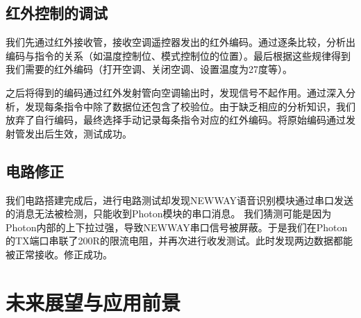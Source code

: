     \subsection{红外控制的调试}
    \hspace{1.5em}我们先通过红外接收管，接收空调遥控器发出的红外编码。通过逐条比较，分析出编码与指令的关系（如温度控制位、模式控制位的位置）。最后根据这些规律得到我们需要的红外编码（打开空调、关闭空调、设置温度为27度等）。

    \hspace{1.5em}之后将得到的编码通过红外发射管向空调输出时，发现信号不起作用。通过深入分析，发现每条指令中除了数据位还包含了校验位。由于缺乏相应的分析知识，我们放弃了自行编码，最终选择手动记录每条指令对应的红外编码。将原始编码通过发射管发出后生效，测试成功。

    \subsection{电路修正}
    \hspace{1.5em}我们电路搭建完成后，进行电路测试却发现NEWWAY语音识别模块通过串口发送的消息无法被检测，只能收到Photon模块的串口消息。
    \hspace{1.5em}我们猜测可能是因为Photon内部的上下拉过强，导致NEWWAY串口信号被屏蔽。于是我们在Photon的TX端口串联了200R的限流电阻，并再次进行收发测试。此时发现两边数据都能被正常接收。修正成功。

\section{未来展望与应用前景}




